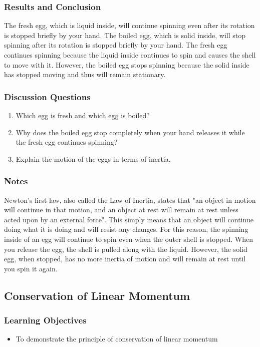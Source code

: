 \subsubsection*{Results and Conclusion}
The fresh egg, which is liquid inside, will continue spinning even after its rotation is stopped briefly by your hand. The boiled egg, which is solid inside, will stop spinning after its rotation is stopped briefly by your hand.  
The fresh egg continues spinning because the liquid inside continues to spin and causes the shell to move with it. However, the boiled egg stops spinning because the solid inside has stopped moving and thus will remain stationary.  

\subsubsection*{Discussion Questions}
\begin{enumerate}
\item{Which egg is fresh and which egg is boiled?}
\item{Why does the boiled egg stop completely when your hand releases it while the fresh egg continues spinning?}
\item{Explain the motion of the eggs in terms of inertia.} 
\end{enumerate}

\subsubsection*{Notes}
Newton's first law, also called the Law of Inertia, states that "an object in motion will continue in that motion, and an object at rest will remain at rest unless acted upon by an external force". This simply means that an object will continue doing what it is doing and will resist any changes.  
For this reason, the spinning inside of an egg will continue to spin even when the outer shell is stopped. When you release the egg, the shell is pulled along with the liquid. However, the solid egg, when stopped, has no more inertia of motion and will remain at rest until you spin it again.  

\subsection{Conservation of Linear Momentum}

\subsubsection*{Learning Objectives}
\begin{itemize}
\item{To demonstrate the principle of conservation of linear momentum}
\end{itemize}

